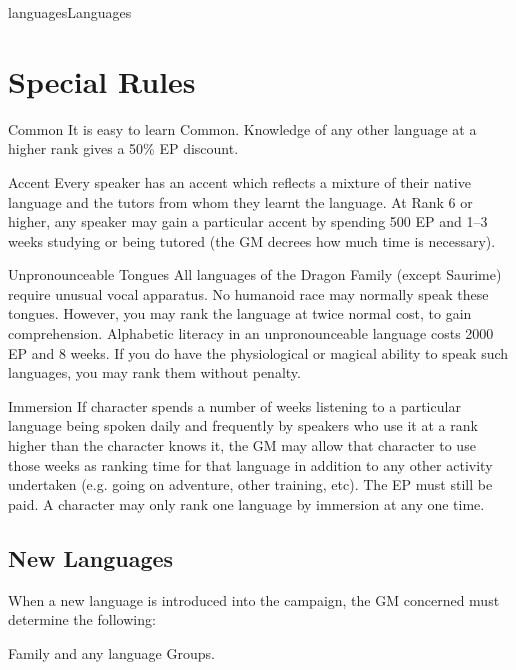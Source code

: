 \begin{Skill}[2.1]{languages}{Languages}
\section{Special Rules}

\begin{Description}

\item[Common] It is easy to learn Common.  Knowledge of any other
  language at a higher rank gives a 50\% EP discount.

\item[Accent] Every speaker has an accent which reflects a mixture of
  their native language and the tutors from whom they learnt the
  language. At Rank 6 or higher, any speaker may gain a particular
  accent by spending 500 EP and 1–3 weeks studying or being tutored
  (the GM decrees how much time is necessary).

\item[Unpronounceable Tongues] All languages of the Dragon Family
  (except Saurime) require unusual vocal apparatus.  No humanoid race
  may normally speak these tongues.  However, you may rank the
  language at twice normal cost, to gain comprehension.  Alphabetic
  literacy in an unpronounceable language costs 2000 EP and 8 weeks.
  If you do have the physiological or magical ability to speak such
  languages, you may rank them without penalty.

\item[Immersion] If character spends a number of weeks listening to a
  particular language being spoken daily and frequently by speakers
  who use it at a rank higher than the character knows it, the GM may
  allow that character to use those weeks as ranking time for that
  language in addition to any other activity undertaken (e.g. going on
  adventure, other training, etc).  The EP must still be paid.  A
  character may only rank one language by immersion at any one time.

\end{Description}

\subsection{New Languages}

When a new language is introduced into the campaign, the GM concerned
must determine the following:

\begin{Itemize}

\item Family and any language Groups. 


\end{Itemize}
\end{Skill}
